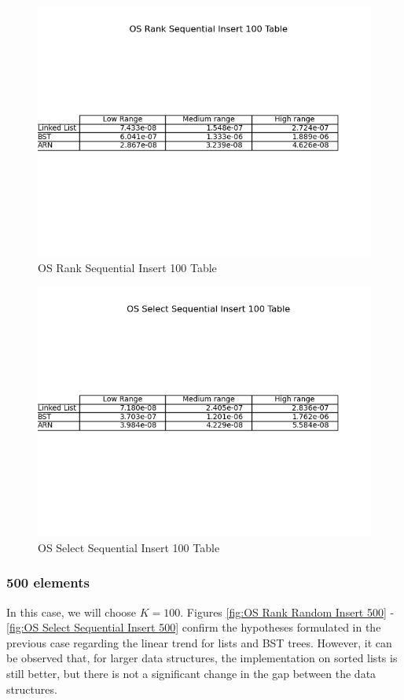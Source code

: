\documentclass[11pt]{article}
\begin{document}
 \begin{figure}[H]
  \centering
  \includegraphics[width=0.8\linewidth]{Images/100/OS Rank Sequential Insert 100 Table.png}
  \caption{OS Rank Sequential Insert 100 Table }
  \label{fig:OS Rank Sequential Insert 100 Table}
\end{figure}
 \begin{figure}[H]
  \centering
  \includegraphics[width=0.8\linewidth]{Images/100/OS Select Sequential Insert 100 Table.png}
  \caption{OS Select Sequential Insert 100 Table }
  \label{fig:OS Select Sequential Insert 100 Table}
\end{figure}
\subsubsection{500 elements}

In this case, we will choose $K = 100$. 
Figures
\ref{fig:OS Rank Random Insert 500} - \ref{fig:OS Select Sequential Insert 500} confirm the hypotheses formulated in the previous case regarding the linear trend for lists and BST trees. However, it can be observed that, for larger data structures, the implementation on sorted lists is still better, but there is not a significant change in the gap between the data structures.
\end{document}

